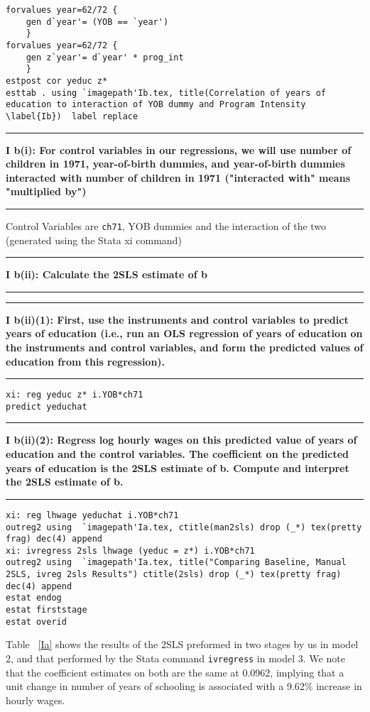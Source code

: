 \documentclass[12pt]{article}
\newcommand\question[2]{\vspace{1em}\hrule\vspace{1em}\textbf{#1: #2}\vspace{1em}\hrule\vspace{1em}}
\begin{document}
\begin{lstlisting}
forvalues year=62/72 {
	gen d`year'= (YOB == `year')
	}
forvalues year=62/72 {
	gen z`year'= d`year' * prog_int
	}
estpost cor yeduc z*
esttab . using `imagepath'Ib.tex, title(Correlation of years of education to interaction of YOB dummy and Program Intensity \label{Ib})  label replace
\end{lstlisting}

\question{I b(i)}{For control variables in our regressions, we will use number of children in 1971, year-of-birth dummies, and year-of-birth dummies interacted with number of children in 1971 ("interacted with" means "multiplied by")}
Control Variables are \verb|ch71|, YOB dummies and the interaction of the two (generated using the Stata  xi command)
 
\question{I b(ii)}{Calculate the 2SLS estimate of b}

\question{I b(ii)(1)}{ First, use the instruments and control variables to predict years of education (i.e., run an OLS regression of years of education on the instruments and control variables, and form the predicted values of education from this regression). }
\begin{lstlisting}
xi: reg yeduc z* i.YOB*ch71
predict yeduchat
\end{lstlisting}

\question{I b(ii)(2)}{Regress log hourly wages on this predicted value of years of education and the control variables. The coefficient on the predicted years of education is the 2SLS estimate of b. Compute and interpret the 2SLS estimate of b.}

\begin{lstlisting}
xi: reg lhwage yeduchat i.YOB*ch71
outreg2 using  `imagepath'Ia.tex, ctitle(man2sls) drop (_*) tex(pretty frag) dec(4) append
xi: ivregress 2sls lhwage (yeduc = z*) i.YOB*ch71
outreg2 using  `imagepath'Ia.tex, title("Comparing Baseline, Manual 2SLS, ivreg 2sls Results") ctitle(2sls) drop (_*) tex(pretty frag) dec(4) append
estat endog
estat firststage
estat overid
\end{lstlisting}

\begin{table}
\caption{}

\label{Ia}
\end{table}
Table ~\ref{Ia} shows the results of the 2SLS preformed in two stages by us in model 2, and that performed by the Stata command \verb|ivregress| in model 3. We note that the coefficient estimates on both are the same at 0.0962, implying that a unit change in number of years of schooling is associated with a 9.62\% increase in hourly wages.
\end{document}

